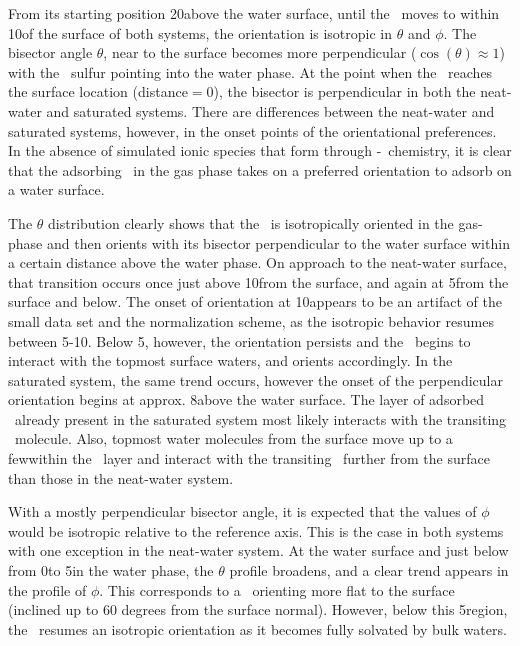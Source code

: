 	From its starting position 20\angs above the water surface, until the \suldiox~moves to within 10\angs of the surface of both systems, the orientation is isotropic in $\theta$ and $\phi$. The bisector angle $\theta$, near to the surface becomes more perpendicular ($\cos(\theta)\approx1$) with the \suldiox~sulfur pointing into the water phase. At the point when the \suldiox~reaches the surface location (distance$=0$), the bisector is perpendicular in both the neat-water and saturated systems. There are differences between the neat-water and saturated systems, however, in the onset points of the orientational preferences. In the absence of simulated ionic species that form through \suldiox-\wat~chemistry, it is clear that the adsorbing \suldiox~in the gas phase takes on a preferred orientation to adsorb on a water surface.
 
  The $\theta$ distribution clearly shows that the \suldiox~is isotropically oriented in the gas-phase and then orients with its bisector perpendicular to the water surface within a certain distance above the water phase. On approach to the neat-water surface, that transition occurs once just above 10\angs from the surface, and again at 5\angs from the surface and below. The onset of orientation at 10\angs appears to be an artifact of the small data set and the normalization scheme, as the isotropic behavior resumes between 5-10\angs. Below 5\angs, however, the orientation persists and the \suldiox~begins to interact with the topmost surface waters, and orients accordingly. In the saturated system, the same trend occurs, however the onset of the perpendicular orientation begins at approx. 8\angs above the water surface. The layer of adsorbed \suldiox~already present in the saturated system most likely interacts with the transiting \suldiox~molecule. Also, topmost water molecules from the surface move up to a few\angs within the \suldiox~layer and interact with the transiting \suldiox~further from the surface than those in the neat-water system.

  With a mostly perpendicular bisector angle, it is expected that the values of $\phi$ would be isotropic relative to the reference axis. This is the case in both systems with one exception in the neat-water system. At the water surface and just below from 0\angs to 5\angs in the water phase, the $\theta$ profile broadens, and a clear trend appears in the profile of $\phi$. This corresponds to a \suldiox~orienting more flat to the surface (inclined up to 60 degrees from the surface normal). However, below this 5\angs region, the \suldiox~resumes an isotropic orientation as it becomes fully solvated by bulk waters.

